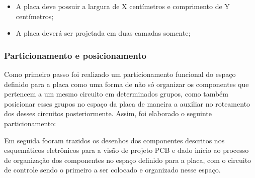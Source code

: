 \begin{itemize}
    \item A placa deve possuir a largura de X centímetros e comprimento de Y centímetros;
    
    \item A placa deverá ser projetada em duas camadas somente; 
\end{itemize}


\subsubsection{Particionamento e posicionamento}

Como primeiro passo foi realizado um particionamento funcional do espaço definido para a placa como uma forma de não só organizar os componentes que pertencem a um mesmo circuito em determinados grupos, como também posicionar esses grupos no espaço da placa de maneira a auxiliar no roteamento dos desses circuitos posteriormente. Assim, foi elaborado o seguinte particionamento:


    \begin{figure}[h!]
            \captionsetup{width=16cm}
   \end{figure}


Em seguida fooram trazidos os desenhos dos componentes descritos nos esquemáticos eletrônicos para a visão de projeto PCB e dado início ao processo de organização dos componentes no espaço definido para a placa, com o circuito de controle sendo o primeiro a ser colocado e organizado nesse espaço.

